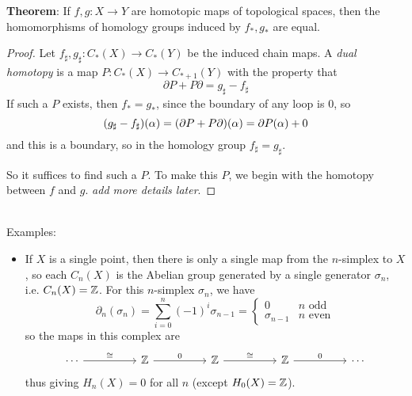 \documentclass{amsart}
\begin{document}
	 \textbf{Theorem}: If $f,g:X\to Y$ are homotopic maps of topological spaces, then the homomorphisms of homology groups induced by $f_*,g_*$ are equal.
	 \begin{proof}
	 	Let $f_{\sharp},g_{\sharp}:C_*(X)\to C_*(Y)$ be the induced chain maps. A \textit{dual homotopy} is a map $P:C_*(X)\to C_{*+1}(Y)$ with the property that
	 	$$
	 	\partial P + P\partial = g_{\sharp} - f_{\sharp}
	 	$$
	 	If such a $P$ exists, then $f_*=g_*$, since the boundary of any loop is $0$, so 
	 	$$
	 	(g_{\sharp} - f_{\sharp})(\alpha) = (\partial P + P\partial)(\alpha) = \partial P(\alpha) + 0 
	 	$$
	 	and this is a boundary, so in the homology group $f_{\sharp} = g_{\sharp}$.
	 	
	 	So it suffices to find such a $P$. To make this $P$, we begin with the homotopy between $f$ and $g$. \textit{add more details later}.
	 \end{proof}\\
	 
	 Examples:
	 \begin{itemize}
	 	\item If $X$ is a single point, then there is only a single map from the $n$-simplex to $X$, so each $C_n(X)$ is the Abelian group generated by a single generator $\sigma_n$, i.e. $C_n(X)=\mathbb{Z}$. For this $n$-simplex $\sigma_n$, we have 
	 	$$
	 	\partial_n (\sigma_n) = \sum_{i=0}^{n} (-1)^i \sigma_{n-1} = \begin{cases} 0 & n \text{ odd}\\
	 		\sigma_{n-1} & n \text{ even}
	 	\end{cases}
	 	$$
	 	so the maps in this complex are 
	 	$$
	 	\begin{tikzcd}
	 		\cdots && {\Z} && {\Z} && {\Z} && \cdots
	 		\arrow["\cong", from=1-1, to=1-3]
	 		\arrow["0", from=1-3, to=1-5]
	 		\arrow["\cong", from=1-5, to=1-7]
	 		\arrow["0", from=1-7, to=1-9]
	 	\end{tikzcd}
	 	$$
	 	thus giving $H_n(X) = 0$ for all $n$ (except $H_0(X)=\mathbb{Z}$).
	 \end{itemize}
	 
\end{document}
